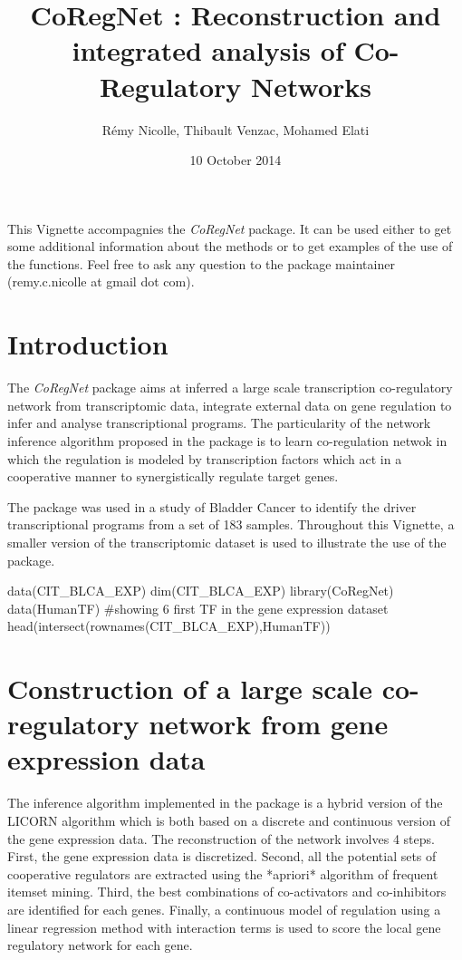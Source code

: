\documentclass[12pt]{article}
\begin{document}


\title{CoRegNet : Reconstruction and integrated analysis of Co-Regulatory Networks}
\author{R\'emy Nicolle, Thibault Venzac, Mohamed Elati}
\date{10 October 2014}
\maketitle

This Vignette accompagnies the \textit{CoRegNet} package. It can be used either
to get some additional information about the methods or to get examples
of the use of the functions. Feel free to ask any question to the
package maintainer (remy.c.nicolle at gmail dot com).

\section{Introduction}
The \textit{CoRegNet} package aims at inferred a large scale transcription
co-regulatory network from transcriptomic data, integrate external data
on gene regulation to infer and analyse transcriptional programs. The
particularity of the network inference algorithm proposed in the package
is to learn co-regulation netwok in which the regulation is modeled by
transcription factors which act in a cooperative manner to
synergistically regulate target genes.

The package was used in a study of Bladder Cancer to identify the driver
transcriptional programs from a set of 183 samples. Throughout this
Vignette, a smaller version of the transcriptomic dataset is used to
illustrate the use of the package.

    \begin{Schunk}
    \begin{Sinput}
        data(CIT_BLCA_EXP)
        dim(CIT_BLCA_EXP)
        library(CoRegNet)
        data(HumanTF)
        #showing 6 first TF in the gene expression dataset
        head(intersect(rownames(CIT_BLCA_EXP),HumanTF))
    \end{Sinput}
    \end{Schunk}


\section{Construction of a large scale co-regulatory network from gene expression data}

The inference algorithm implemented in the package is a hybrid version
of the LICORN algorithm which is both based on a discrete and continuous
version of the gene expression data. The reconstruction of the network
involves 4 steps. First, the gene expression data is discretized.
Second, all the potential sets of cooperative regulators are extracted
using the *apriori* algorithm of frequent itemset mining. Third, the
best combinations of co-activators and co-inhibitors are identified for
each genes. Finally, a continuous model of regulation using a linear
regression method with interaction terms is used to score the local gene
regulatory network for each gene.
\end{document}
